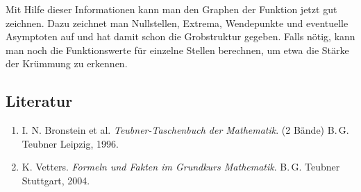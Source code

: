 Mit Hilfe dieser Informationen kann man den Graphen der Funktion jetzt gut zeichnen. Dazu zeichnet man Nullstellen, Extrema, Wendepunkte und eventuelle Asymptoten auf und hat damit schon die Grobstruktur gegeben. Falls nötig, kann man noch die Funktionswerte für einzelne Stellen berechnen, um etwa die Stärke der Krümmung zu erkennen.






\subsection{Literatur}

\begin{enumerate}
\item
I. N. Bronstein et al. \textit{Teubner-Taschenbuch der Mathematik}. (2 Bände)
B.\,G. Teubner Leipzig, 1996.

\item
K. Vetters. \textit{Formeln und Fakten im Grundkurs Mathematik}. B.\,G. Teubner Stuttgart, 2004.

\end{enumerate}

%
